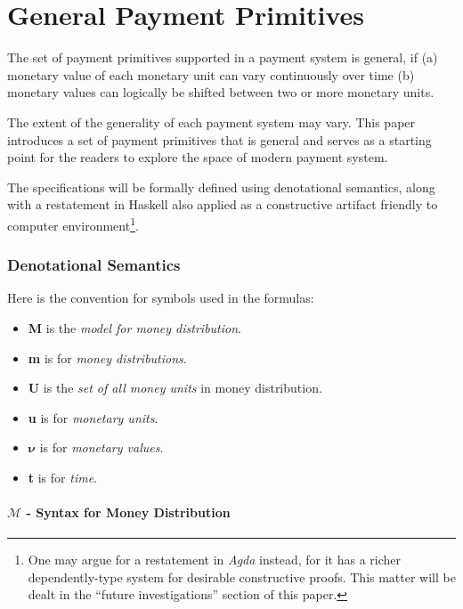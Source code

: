 \part{General Payment Primitives}\label{part:gpp}

The set of payment primitives supported in a payment system is general, if (a) monetary value of
each monetary unit can vary continuously over time (b) monetary values can logically be shifted
between two or more monetary units.

The extent of the generality of each payment system may vary. This paper introduces a set of payment
primitives that is general and serves as a starting point for the readers to explore the space of
modern payment system.

The specifications will be formally defined using denotational semantics, along with a restatement
in Haskell also applied as a constructive artifact friendly to computer environment\footnote{One may
argue for a restatement in \textit{Agda} instead, for it has a richer dependently-type system for
desirable constructive proofs. This matter will be dealt in the ``future investigations'' section of
this paper.}.

\section{Denotational Semantics}

Here is the convention for symbols used in the formulas:

\begin{itemize}
\item \textbf{M} is the \textit{model for money distribution}.
\item \textbf{m} is for \textit{money distributions}.
\item \textbf{U} is the \textit{set of all money units} in money distribution.
\item \textbf{u} is for \textit{monetary units}.
\item $\boldsymbol{\nu}$ is for \textit{monetary values}.
\item \textbf{t} is for \textit{time}.
\end{itemize}

\subsection{$\mathcal{M}$ - Syntax for Money Distribution}

